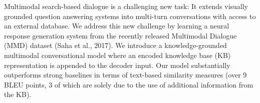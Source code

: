 Multimodal search-based dialogue is a challenging new task: It extends visually grounded question answering systems into multi-turn conversations with access to an external database. We address this new challenge by learning a neural response generation system from the recently released Multimodal Dialogue (MMD) dataset (Saha et al., 2017). We introduce a knowledge-grounded multimodal conversational model where an encoded knowledge base (KB) representation is appended to the decoder input. Our model substantially outperforms strong baselines in terms of text-based similarity measures (over 9 BLEU points, 3 of which are solely due to the use of additional information from the KB).
